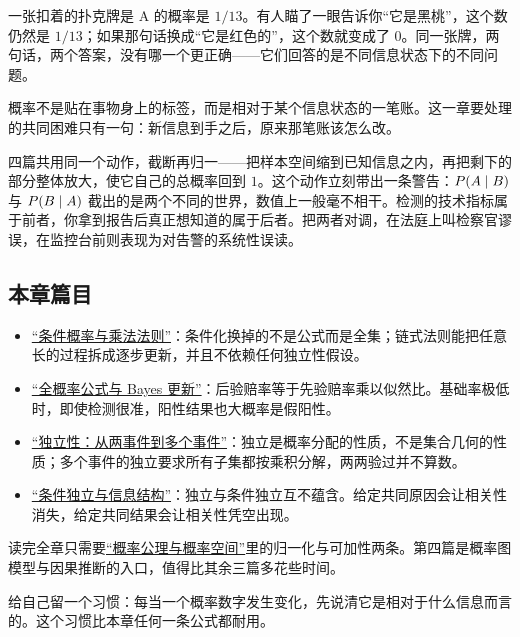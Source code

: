 一张扣着的扑克牌是 A 的概率是 \(1/13\)。有人瞄了一眼告诉你``它是黑桃''，这个数仍然是 \(1/13\)；如果那句话换成``它是红色的''，这个数就变成了 \(0\)。同一张牌，两句话，两个答案，没有哪一个更正确——它们回答的是不同信息状态下的不同问题。

概率不是贴在事物身上的标签，而是相对于某个信息状态的一笔账。这一章要处理的共同困难只有一句：新信息到手之后，原来那笔账该怎么改。

四篇共用同一个动作，截断再归一——把样本空间缩到已知信息之内，再把剩下的部分整体放大，使它自己的总概率回到 \(1\)。这个动作立刻带出一条警告：\(P(A\mid B)\) 与 \(P(B\mid A)\) 截出的是两个不同的世界，数值上一般毫不相干。检测的技术指标属于前者，你拿到报告后真正想知道的属于后者。把两者对调，在法庭上叫检察官谬误，在监控台前则表现为对告警的系统性误读。

\subsection{本章篇目}

\begin{itemize}
\tightlist
\item \hyperref[sec:05-Probability/02-Conditional-Probability/01]{``条件概率与乘法法则''}：条件化换掉的不是公式而是全集；链式法则能把任意长的过程拆成逐步更新，并且不依赖任何独立性假设。
\item \hyperref[sec:05-Probability/02-Conditional-Probability/02]{``全概率公式与 Bayes 更新''}：后验赔率等于先验赔率乘以似然比。基础率极低时，即使检测很准，阳性结果也大概率是假阳性。
\item \hyperref[sec:05-Probability/02-Conditional-Probability/03]{``独立性：从两事件到多个事件''}：独立是概率分配的性质，不是集合几何的性质；多个事件的独立要求所有子集都按乘积分解，两两验过并不算数。
\item \hyperref[sec:05-Probability/02-Conditional-Probability/04]{``条件独立与信息结构''}：独立与条件独立互不蕴含。给定共同原因会让相关性消失，给定共同结果会让相关性凭空出现。
\end{itemize}

读完全章只需要\hyperref[sec:05-Probability/01-Probability-Spaces/02]{``概率公理与概率空间''}里的归一化与可加性两条。第四篇是概率图模型与因果推断的入口，值得比其余三篇多花些时间。

给自己留一个习惯：每当一个概率数字发生变化，先说清它是相对于什么信息而言的。这个习惯比本章任何一条公式都耐用。
